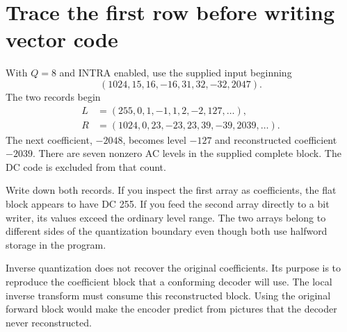 \section{Trace the first row before writing vector code}
With $Q=8$ and INTRA enabled, use the supplied input beginning
\[
 (1024,15,16,-16,31,32,-32,2047).
\]
The two records begin
\[
 \begin{aligned}
  L&=(255,0,1,-1,1,2,-2,127,\ldots),\\
  R&=(1024,0,23,-23,23,39,-39,2039,\ldots).
 \end{aligned}
\]
The next coefficient, $-2048$, becomes
level $-127$ and reconstructed coefficient $-2039$. There are seven nonzero AC
levels in the supplied complete block. The DC code is excluded from that count.

Write down both records. If you inspect the first array as coefficients, the
flat block appears to have DC 255. If you feed the second array directly to a
bit writer, its values exceed the ordinary level range. The two arrays belong
to different sides of the quantization boundary even though both use halfword
storage in the program.

Inverse quantization does not recover the original coefficients. Its purpose is
to reproduce the coefficient block that a conforming decoder will use. The local
inverse transform must consume this reconstructed block. Using the original
forward block would make the encoder predict from pictures that the decoder
never reconstructed.
